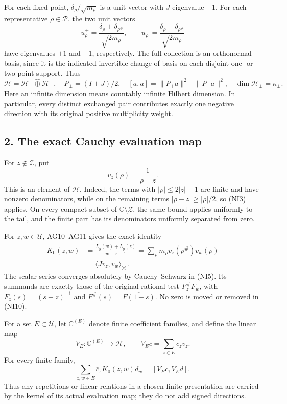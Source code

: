 \documentclass[
  10pt,
  a4paper,
]{article}
\begin{document}
For each fixed point, \(\delta_\rho/\sqrt{m_\rho}\) is a unit vector
with \(J\)-eigenvalue \(+1\). For each representative
\(\rho\in\mathcal P\), the two unit vectors \[
u_\rho^+=\frac{\delta_\rho+\delta_{\rho^\#}}{\sqrt{2m_\rho}},
\qquad
u_\rho^-=\frac{\delta_\rho-\delta_{\rho^\#}}{\sqrt{2m_\rho}}
\tag{NI7}
\] have eigenvalues \(+1\) and \(-1\), respectively. The full collection
is an orthonormal basis, since it is the indicated invertible change of
basis on each disjoint one- or two-point support. Thus \[
\mathcal H=\mathcal H_+\mathbin{\widehat\oplus}\mathcal H_-,
\quad P_\pm=(I\pm J)/2,
\quad [a,a]=\|P_+a\|^2-\|P_-a\|^2,
\quad \dim\mathcal H_\pm=\kappa_\pm.
\tag{NI8}
\] Here an infinite dimension means countably infinite Hilbert
dimension. In particular, every distinct exchanged pair contributes
exactly one negative direction with its original positive multiplicity
weight.

\subsection{2. The exact Cauchy evaluation
map}\label{the-exact-cauchy-evaluation-map}

For \(z\notin\mathcal Z\), put \[
v_z(\rho)=\frac1{\rho-z}.
\tag{NI9}
\] This is an element of \(\mathcal H\). Indeed, the terms with
\(|\rho|\le2|z|+1\) are finite and have nonzero denominators, while on
the remaining terms \(|\rho-z|\ge|\rho|/2\), so (NI3) applies. On every
compact subset of \(\mathbb C\setminus\mathcal Z\), the same bound
applies uniformly to the tail, and the finite part has its denominators
uniformly separated from zero.

For \(z,w\in\mathcal U\), AG10--AG11 gives the exact identity \[
\begin{split}
K_0(z,w)
&=\frac{L_g(w)+\overline{L_g(z)}}{w+\bar z-1}
=\sum_\rho m_\rho\overline{v_z(\rho^\#)}v_w(\rho)\\
&=\langle Jv_z,v_w\rangle_{\mathcal H}.
\end{split}
\tag{NI10}
\] The scalar series converges absolutely by Cauchy--Schwarz in (NI5).
Its summands are exactly those of the original rational test
\(F_z^\#F_w\), with \(F_z(s)=(s-z)^{-1}\) and
\(F^\#(s)=\overline{F(1-\bar s)}\). No zero is moved or removed in
(NI10).

For a set \(E\subset\mathcal U\), let \(\mathbb C^{(E)}\) denote finite
coefficient families, and define the linear map \[
V_E:\mathbb C^{(E)}\longrightarrow\mathcal H,
\qquad V_Ec=\sum_{z\in E}c_zv_z.
\tag{NI11}
\] For every finite family, \[
\sum_{z,w\in E}\bar c_zK_0(z,w)d_w
=[V_Ec,V_Ed].
\tag{NI12}
\] Thus any repetitions or linear relations in a chosen finite
presentation are carried by the kernel of its actual evaluation map;
they do not add signed directions.
\end{document}
